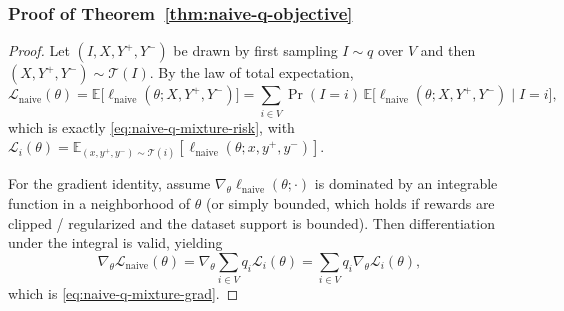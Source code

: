 \documentclass{article}
\theoremstyle{plain}
\theoremstyle{definition}
\theoremstyle{remark}
\begin{document}
\subsubsection{Proof of Theorem~\ref{thm:naive-q-objective}}
\begin{proof}
Let $(I,X,Y^+,Y^-)$ be drawn by first sampling $I\sim q$ over $V$ and then
$(X,Y^+,Y^-)\sim \mathcal{T}(I)$. By the law of total expectation,
\[
\mathcal{L}_{\text{naive}}(\theta)
=
\mathbb{E}\big[\ell_{\text{naive}}(\theta;X,Y^+,Y^-)\big]
=
\sum_{i\in V}\Pr(I=i)\,
\mathbb{E}\big[\ell_{\text{naive}}(\theta;X,Y^+,Y^-)\mid I=i\big],
\]
which is exactly \eqref{eq:naive-q-mixture-risk}, with
$\mathcal{L}_i(\theta)=\mathbb{E}_{(x,y^+,y^-)\sim\mathcal{T}(i)}[\ell_{\text{naive}}(\theta;x,y^+,y^-)]$.

For the gradient identity, assume $\nabla_\theta \ell_{\text{naive}}(\theta;\cdot)$
is dominated by an integrable function in a neighborhood of $\theta$ (or simply
bounded, which holds if rewards are clipped / regularized and the dataset support is bounded).
Then differentiation under the integral is valid, yielding
\[
\nabla_\theta \mathcal{L}_{\text{naive}}(\theta)
=
\nabla_\theta \sum_{i\in V} q_i \mathcal{L}_i(\theta)
=
\sum_{i\in V} q_i \nabla_\theta \mathcal{L}_i(\theta),
\]
which is \eqref{eq:naive-q-mixture-grad}.
\end{proof}
\end{document}
